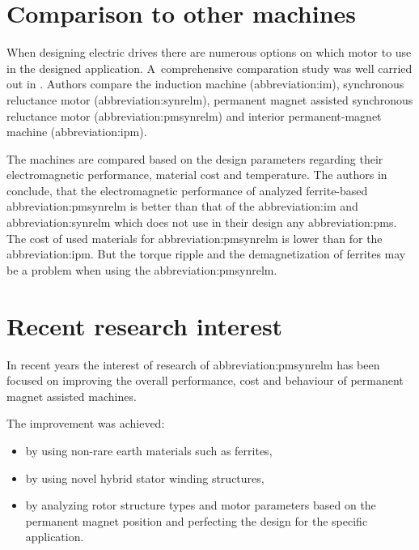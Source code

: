 \documentclass[a4paper, twoside, 11pt]{article}
\begin{document}
\section{Comparison to other machines}
    When designing electric drives there are numerous options on which motor to use in the designed application. A~comprehensive comparation study was well carried out in \cite{zhang-Comprehensive-Comparative-Study-on-Permanent-Magnet-Assisted-Synchronous-Reluctance-Motors-and-Other-Types-of-Motor}. Authors compare the induction machine (\gls{abbreviation:im}), synchronous reluctance motor (\gls{abbreviation:synrelm}), permanent magnet assisted synchronous reluctance motor (\gls{abbreviation:pmsynrelm}) and interior permanent-magnet machine (\gls{abbreviation:ipm}).\par
    The machines are compared based on the design parameters regarding their electromagnetic performance, material cost and temperature. The authors in \cite{zhang-Comprehensive-Comparative-Study-on-Permanent-Magnet-Assisted-Synchronous-Reluctance-Motors-and-Other-Types-of-Motor} conclude, that the electromagnetic performance of analyzed ferrite-based \gls{abbreviation:pmsynrelm} is better than that of the \gls{abbreviation:im} and \gls{abbreviation:synrelm} which does not use in their design any \gls{abbreviation:pm}s. The cost of used materials for \gls{abbreviation:pmsynrelm} is lower than for the \gls{abbreviation:ipm}. But the torque ripple and the demagnetization of ferrites may be a problem when using the \gls{abbreviation:pmsynrelm}. \cite{zhang-Comprehensive-Comparative-Study-on-Permanent-Magnet-Assisted-Synchronous-Reluctance-Motors-and-Other-Types-of-Motor}
\section{Recent research interest}
    In recent years the interest of research of \gls{abbreviation:pmsynrelm} has been focused on improving the overall performance, cost and behaviour of permanent magnet assisted machines.\par
    The improvement was achieved:
        \begin{itemize}
        \item by using non-rare earth materials such as ferrites,
        \item by using novel hybrid stator winding structures,
        \item by analyzing rotor structure types and motor parameters based on the permanent magnet position and perfecting the design for the specific application.
        \end{itemize}
\end{document}
